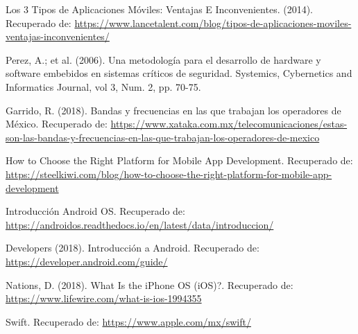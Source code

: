 \begin{thebibliography}{0}
	 Los 3 Tipos de Aplicaciones Móviles: Ventajas E Inconvenientes. (2014). Recuperado de: \url{https://www.lancetalent.com/blog/tipos-de-aplicaciones-moviles-ventajas-inconvenientes/}
	
	 Perez, A.; et al. (2006). Una metodología para el desarrollo de hardware y software embebidos en sistemas críticos de seguridad. Systemics, Cybernetics and Informatics Journal, vol 3, Num. 2, pp. 70-75.

	 Garrido, R. (2018). Bandas y frecuencias en las que trabajan los operadores de México. Recuperado de: \url{https://www.xataka.com.mx/telecomunicaciones/estas-son-las-bandas-y-frecuencias-en-las-que-trabajan-los-operadores-de-mexico}
	
	 How to Choose the Right Platform for Mobile App Development. Recuperado de: \url{https://steelkiwi.com/blog/how-to-choose-the-right-platform-for-mobile-app-development}
	
	 Introducción Android OS. Recuperado de: \url{https://androidos.readthedocs.io/en/latest/data/introduccion/}
	
	 Developers (2018). Introducción a Android. Recuperado de: \url{https://developer.android.com/guide/}
	
	 Nations, D. (2018). What Is the iPhone OS (iOS)?. Recuperado de: \url{https://www.lifewire.com/what-is-ios-1994355}
	
	 Swift. Recuperado de: \url{https://www.apple.com/mx/swift/}
	
	
	
\end{thebibliography}